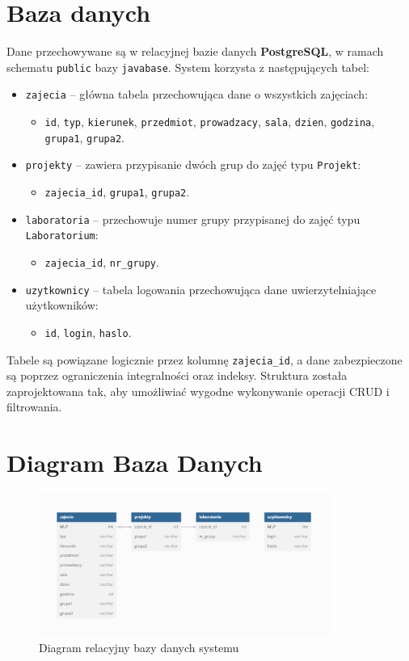 \section{Baza danych}

Dane przechowywane są w relacyjnej bazie danych \textbf{PostgreSQL}, w ramach schematu \texttt{public} bazy \texttt{javabase}. System korzysta z następujących tabel:

\begin{itemize}
    \item \texttt{zajecia} – główna tabela przechowująca dane o wszystkich zajęciach:
    \begin{itemize}
        \item \texttt{id}, \texttt{typ}, \texttt{kierunek}, \texttt{przedmiot}, \texttt{prowadzacy}, \texttt{sala}, \texttt{dzien}, \texttt{godzina}, \texttt{grupa1}, \texttt{grupa2}.
    \end{itemize}

    \item \texttt{projekty} – zawiera przypisanie dwóch grup do zajęć typu \texttt{Projekt}:
    \begin{itemize}
        \item \texttt{zajecia\_id}, \texttt{grupa1}, \texttt{grupa2}.
    \end{itemize}

    \item \texttt{laboratoria} – przechowuje numer grupy przypisanej do zajęć typu \texttt{Laboratorium}:
    \begin{itemize}
        \item \texttt{zajecia\_id}, \texttt{nr\_grupy}.
    \end{itemize}

    \item \texttt{uzytkownicy} – tabela logowania przechowująca dane uwierzytelniające użytkowników:
    \begin{itemize}
        \item \texttt{id}, \texttt{login}, \texttt{haslo}.
    \end{itemize}
\end{itemize}

Tabele są powiązane logicznie przez kolumnę \texttt{zajecia\_id}, a dane zabezpieczone są poprzez ograniczenia integralności oraz indeksy. Struktura została zaprojektowana tak, aby umożliwiać wygodne wykonywanie operacji CRUD i filtrowania.

\section{Diagram Baza Danych}

\begin{figure}[H]
    \centering
    \includegraphics[width=0.85\textwidth]{figures/diagramDB.png}
    \caption{Diagram relacyjny bazy danych systemu}
    \label{fig:diagram-db}
\end{figure}